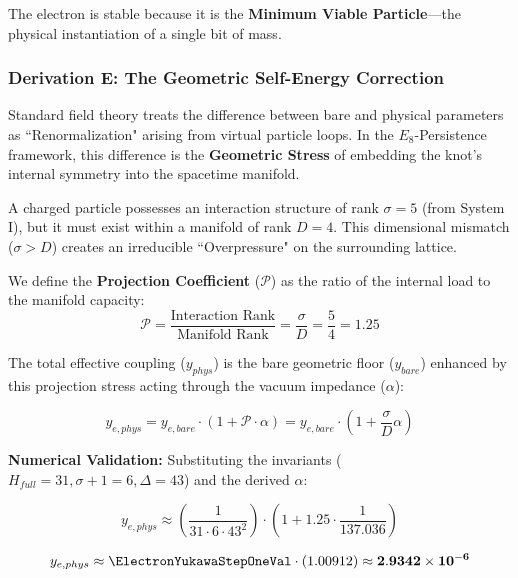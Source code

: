 The electron is stable because it is the \textbf{Minimum Viable Particle}—the physical instantiation of a single bit of mass.

\subsubsection{Derivation E: The Geometric Self-Energy Correction}

Standard field theory treats the difference between bare and physical parameters as ``Renormalization" arising from virtual particle loops. In the $E_8$-Persistence framework, this difference is the \textbf{Geometric Stress} of embedding the knot's internal symmetry into the spacetime manifold.

A charged particle possesses an interaction structure of rank $\sigma=5$ (from System I), but it must exist within a manifold of rank $D=4$. This dimensional mismatch ($\sigma > D$) creates an irreducible ``Overpressure" on the surrounding lattice.

We define the \textbf{Projection Coefficient} ($\mathcal{P}$) as the ratio of the internal load to the manifold capacity:
\begin{equation}
\mathcal{P} = \frac{\text{Interaction Rank}}{\text{Manifold Rank}} = \frac{\sigma}{D} = \frac{5}{4} = 1.25
\end{equation}

The total effective coupling ($y_{phys}$) is the bare geometric floor ($y_{bare}$) enhanced by this projection stress acting through the vacuum impedance ($\alpha$):

\begin{equation}
y_{e,phys} = y_{e,bare} \cdot \left(1 + \mathcal{P} \cdot \alpha \right) = y_{e,bare} \cdot \left(1 + \frac{\sigma}{D}\alpha \right)
\end{equation}

\textbf{Numerical Validation:}
Substituting the invariants ($H_{full}=31, \sigma+1=6, \Delta=43$) and the derived $\alpha$:

\begin{equation}
y_{e,phys} \approx \left(\frac{1}{31 \cdot 6 \cdot 43^2}\right) \cdot \left(1 + 1.25 \cdot \frac{1}{137.036}\right)
\end{equation}

\begin{equation}
y_{e,phys} \approx \ElectronYukawaStepOneVal \cdot (1.00912) \approx \mathbf{2.9342 \times 10^{-6}}
\end{equation}

